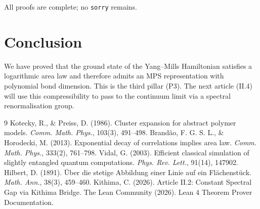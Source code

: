 \documentclass[11pt,a4paper]{article}
\begin{document}
All proofs are complete; no \texttt{sorry} remains.

\section{Conclusion}
We have proved that the ground state of the Yang–Mills Hamiltonian satisfies a logarithmic area law and therefore admits an MPS representation with polynomial bond dimension. This is the third pillar (P3). The next article (II.4) will use this compressibility to pass to the continuum limit via a spectral renormalisation group.


\begin{thebibliography}{9}
  Kotecky, R., \& Preiss, D. (1986). Cluster expansion for abstract polymer models. \emph{Comm. Math. Phys.}, 103(3), 491–498.
  Brandão, F. G. S. L., \& Horodecki, M. (2013). Exponential decay of correlations implies area law. \emph{Comm. Math. Phys.}, 333(2), 761–798.
  Vidal, G. (2003). Efficient classical simulation of slightly entangled quantum computations. \emph{Phys. Rev. Lett.}, 91(14), 147902.
  Hilbert, D. (1891). Über die stetige Abbildung einer Linie auf ein Flächenstück. \emph{Math. Ann.}, 38(3), 459–460.
  Kithima, C. (2026). Article II.2: Constant Spectral Gap via Kithima Bridge.
  The Lean Community (2026). Lean 4 Theorem Prover Documentation.
\end{thebibliography}
\end{document}
